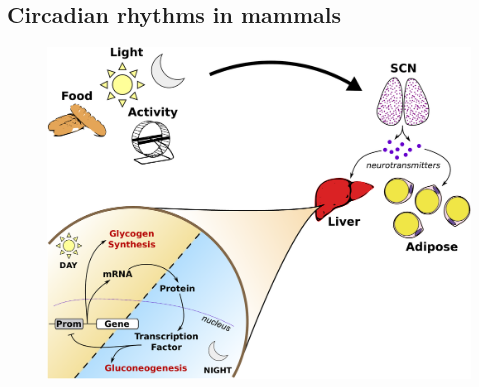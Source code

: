 \subsection{Circadian rhythms in mammals}




\begin{figure}
  \centering
  \includegraphics[width=\textwidth]{chap1/figures/timescale_separation.pdf}
  \label{fig:feedforward}
\end{figure}

